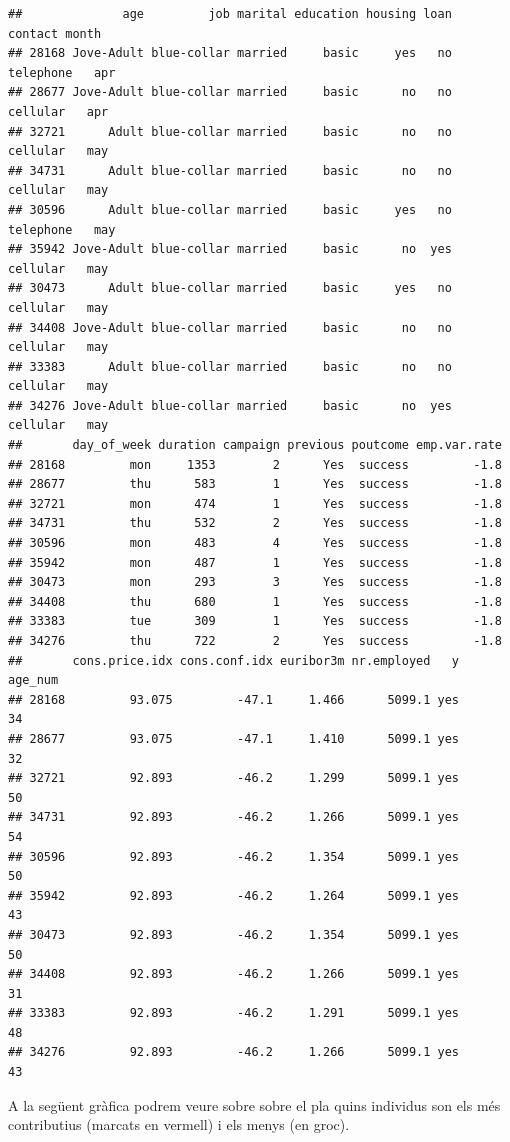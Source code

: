 \documentclass[
]{article}
\begin{document}
\begin{verbatim}
##              age         job marital education housing loan   contact month
## 28168 Jove-Adult blue-collar married     basic     yes   no telephone   apr
## 28677 Jove-Adult blue-collar married     basic      no   no  cellular   apr
## 32721      Adult blue-collar married     basic      no   no  cellular   may
## 34731      Adult blue-collar married     basic      no   no  cellular   may
## 30596      Adult blue-collar married     basic     yes   no telephone   may
## 35942 Jove-Adult blue-collar married     basic      no  yes  cellular   may
## 30473      Adult blue-collar married     basic     yes   no  cellular   may
## 34408 Jove-Adult blue-collar married     basic      no   no  cellular   may
## 33383      Adult blue-collar married     basic      no   no  cellular   may
## 34276 Jove-Adult blue-collar married     basic      no  yes  cellular   may
##       day_of_week duration campaign previous poutcome emp.var.rate
## 28168         mon     1353        2      Yes  success         -1.8
## 28677         thu      583        1      Yes  success         -1.8
## 32721         mon      474        1      Yes  success         -1.8
## 34731         thu      532        2      Yes  success         -1.8
## 30596         mon      483        4      Yes  success         -1.8
## 35942         mon      487        1      Yes  success         -1.8
## 30473         mon      293        3      Yes  success         -1.8
## 34408         thu      680        1      Yes  success         -1.8
## 33383         tue      309        1      Yes  success         -1.8
## 34276         thu      722        2      Yes  success         -1.8
##       cons.price.idx cons.conf.idx euribor3m nr.employed   y age_num
## 28168         93.075         -47.1     1.466      5099.1 yes      34
## 28677         93.075         -47.1     1.410      5099.1 yes      32
## 32721         92.893         -46.2     1.299      5099.1 yes      50
## 34731         92.893         -46.2     1.266      5099.1 yes      54
## 30596         92.893         -46.2     1.354      5099.1 yes      50
## 35942         92.893         -46.2     1.264      5099.1 yes      43
## 30473         92.893         -46.2     1.354      5099.1 yes      50
## 34408         92.893         -46.2     1.266      5099.1 yes      31
## 33383         92.893         -46.2     1.291      5099.1 yes      48
## 34276         92.893         -46.2     1.266      5099.1 yes      43
\end{verbatim}

A la següent gràfica podrem veure sobre sobre el pla quins individus son
els més contributius (marcats en vermell) i els menys (en groc).
\end{document}
